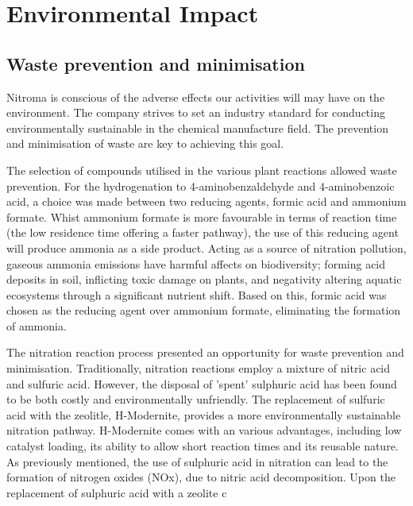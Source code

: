 \section{Environmental Impact}

\subsection{Waste prevention and minimisation }

Nitroma is conscious of the adverse effects our activities will may have on the environment. The company strives to set an industry standard for conducting environmentally sustainable in the chemical manufacture field. The prevention and minimisation of waste are key to achieving this goal. 

The selection of compounds utilised in the various plant reactions allowed waste prevention. For the hydrogenation to 4-aminobenzaldehyde and 4-aminobenzoic acid, a choice was made between two reducing agents, formic acid and ammonium formate. Whist ammonium formate is more favourable in terms of reaction time (the low residence time offering a faster pathway), the use of this reducing agent will produce ammonia as a side product. Acting as a  source of nitration pollution, gaseous ammonia emissions have harmful affects on biodiversity; forming acid deposits in soil, inflicting toxic damage on plants, and negativity altering aquatic ecosystems through a significant nutrient shift. Based on this, formic acid was chosen as the reducing agent over ammonium formate, eliminating the formation of ammonia. 

The nitration reaction process presented an opportunity for waste prevention and minimisation. Traditionally, nitration reactions employ a mixture of nitric acid and sulfuric acid. However, the disposal of 'spent' sulphuric acid has been found to be both costly and environmentally unfriendly. The replacement of sulfuric acid with the zeolitle, H-Modernite, provides a more environmentally sustainable nitration pathway. H-Modernite comes with an various advantages, including low catalyst loading, its ability to allow short reaction times and its reusable nature. As  previously mentioned, the use of sulphuric acid in nitration can lead to the formation of nitrogen oxides (NOx), due to nitric acid decomposition. Upon the replacement of sulphuric acid with a zeolite c



